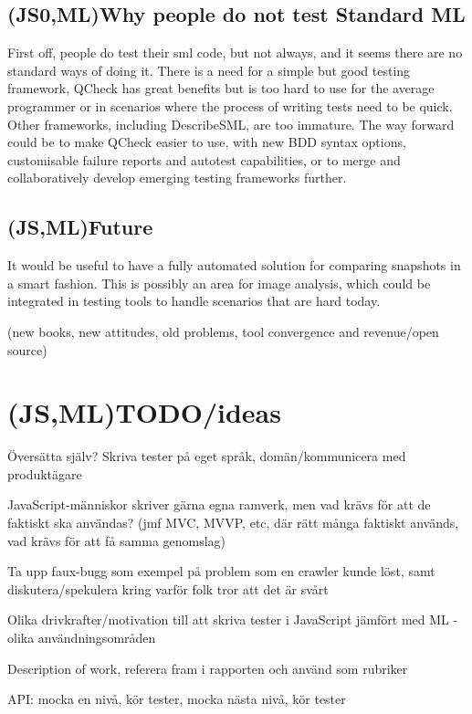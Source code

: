 \documentclass[11pt]{article}
\begin{document}
\subsection{(JS0,ML)Why people do not test Standard ML}

First off, people do test their \gls{sml} code, but not always, and it seems there are no standard ways of doing it. There is a need for a simple but good testing framework, QCheck has great benefits but is too hard to use for the average programmer or in scenarios where the process of writing tests need to be quick. Other frameworks, including DescribeSML, are too immature. The way forward could be to make QCheck easier to use, with new BDD syntax options, customisable failure reports and autotest capabilities, or to merge and collaboratively develop emerging testing frameworks further.

\subsection{(JS,ML)Future}

It would be useful to have a fully automated solution for comparing snapshots in a smart fashion. This is possibly an area for image analysis, which could be integrated in testing tools to handle scenarios that are hard today.

(new books, new attitudes, old problems, tool convergence and revenue/open source)

\section{(JS,ML)TODO/ideas}

Översätta själv? Skriva tester på eget språk, domän/kommunicera med produktägare

JavaScript-människor skriver gärna egna ramverk, men vad krävs för att de faktiskt ska användas? (jmf MVC, MVVP, etc, där rätt många faktiskt används, vad krävs för att få samma genomslag)

Ta upp faux-bugg som exempel på problem som en crawler kunde löst, samt diskutera/spekulera kring varför folk tror att det är svårt

Olika drivkrafter/motivation till att skriva tester i JavaScript jämfört med ML - olika användningsområden

Description of work, referera fram i rapporten och använd som rubriker

API: mocka en nivå, kör tester, mocka nästa nivå, kör tester
\end{document}
